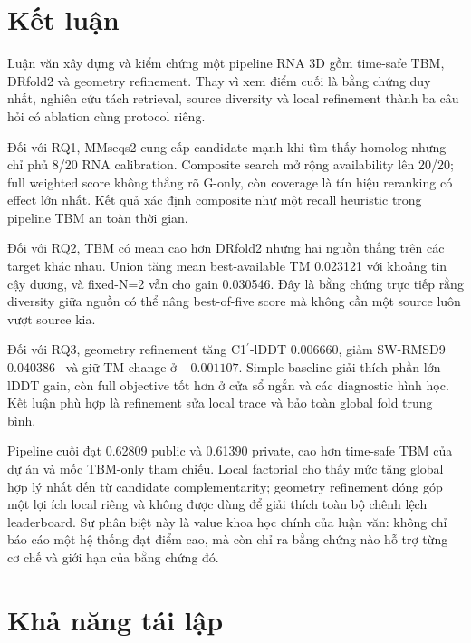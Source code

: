 \documentclass[12pt,a4paper,oneside]{report}
\newcommand{\cprime}{C1$^{\prime}$}
\newcommand{\angstrom}{\text{\AA}}
\begin{document}
\chapter{Kết luận}
\label{chap:conclusion_vi}

Luận văn xây dựng và kiểm chứng một pipeline RNA 3D gồm time-safe TBM, DRfold2 và geometry
refinement. Thay vì xem điểm cuối là bằng chứng duy nhất, nghiên cứu tách retrieval,
source diversity và local refinement thành ba câu hỏi có ablation cùng protocol riêng.

Đối với RQ1, MMseqs2 cung cấp candidate mạnh khi tìm thấy homolog nhưng chỉ phủ 8/20 RNA
calibration. Composite search mở rộng availability lên 20/20; full weighted score không
thắng rõ G-only, còn coverage là tín hiệu reranking có effect lớn nhất. Kết quả xác định
composite như một recall heuristic trong pipeline TBM an toàn thời gian.

Đối với RQ2, TBM có mean cao hơn DRfold2 nhưng hai nguồn thắng trên các target khác nhau.
Union tăng mean best-available TM 0.023121 với khoảng tin cậy dương, và fixed-N=2 vẫn
cho gain 0.030546. Đây là bằng chứng trực tiếp rằng diversity giữa nguồn có thể nâng
best-of-five score mà không cần một source luôn vượt source kia.

Đối với RQ3, geometry refinement tăng \cprime{}-lDDT 0.006660, giảm SW-RMSD9
0.040386~\angstrom{} và giữ TM change ở $-0.001107$. Simple baseline giải thích phần lớn
lDDT gain, còn full objective tốt hơn ở cửa sổ ngắn và các diagnostic hình học. Kết luận
phù hợp là refinement sửa local trace và bảo toàn global fold trung bình.

Pipeline cuối đạt 0.62809 public và 0.61390 private, cao hơn time-safe TBM của dự án và
mốc TBM-only tham chiếu. Local factorial cho thấy mức tăng global hợp lý nhất đến từ
candidate complementarity; geometry refinement đóng góp một lợi ích local riêng và
không được dùng để giải thích toàn bộ chênh lệch leaderboard. Sự phân biệt này là value
khoa học chính của luận văn: không chỉ báo cáo một hệ thống đạt điểm cao, mà còn chỉ ra
bằng chứng nào hỗ trợ từng cơ chế và giới hạn của bằng chứng đó.

\appendix

\chapter{Khả năng tái lập}
\label{app:repro_vi}
\end{document}
